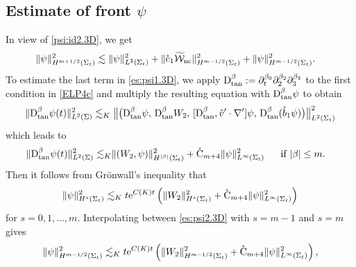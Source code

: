 \documentclass[twoside,11pt]{article}
\numberwithin{equation}{section}
\def\p{\partial}
\begin{document}
\subsection{Estimate of front $\psi$} \label{sec.psi}
In view of \eqref{psi:id2.3D}, we get %
\begin{align}
	& \|\psi\|_{H^{m+1/2}(\Sigma_{t})}^2 	\lesssim 	\|\psi\|_{L^{2}(\Sigma_{t})}^2 	+	\|\mathring{\rm c}_1\widetilde{\mathcal{W}}_{\rm nc}\|_{H^{m-1/2}(\Sigma_{t})}^2  +\|\psi \|_{H^{m-1/2}(\Sigma_{t})}^2.
	\label{es:psi1.3D}
\end{align}
To estimate the last term in  \eqref{es:psi1.3D}, we apply $\mathrm{D}_{\rm tan}^{\beta}:=\p_t^{\beta_0}\p_2^{\beta_2}\p_3^{\beta_3}$ %
to the first condition in \eqref{ELP4c} and multiply the resulting equation with $\mathrm{D}_{\rm tan}^{\beta}\psi$ to obtain
\begin{align}
	\|\mathrm{D}_{\rm tan}^{\beta}\psi(t)\|_{L^{2}(\Sigma)}^{2}
	\lesssim_K	\big\|\big(\mathrm{D}_{\rm tan}^{\beta}\psi , \, \mathrm{D}_{\rm tan}^{\beta}W_2,\,
	[\mathrm{D}_{\rm tan}^{\beta},\mathring{v}'\cdot\nabla']\psi, \, \mathrm{D}_{\rm tan}^{\beta}(\mathring{b}_1\psi) \big) \big\|_{L^{2}(\Sigma_t)}^{2}  \nonumber
\end{align}
which leads to
\begin{align}
	\|\mathrm{D}_{\rm tan}^{\beta}\psi(t)\|_{L^{2}(\Sigma)}^{2}
	\lesssim_K
		& {\|}(W_2,\psi){\|}_{H^{|\beta|}(\Sigma_{t})}^2
		+\mathring{\rm C}_{m+4}  \|\psi\|_{L^{\infty}(\Sigma_{t})}^2
		\ \  &&  		\textrm{if }|\beta|\leq m
		.
	\label{es:psi2a}
\end{align}
Then it follows from Gr\"{o}nwall's inequality that
\begin{align}
	{\|}\psi{\|}_{H^{s}(\Sigma_{t})}^2 	 \lesssim_K	 t\mathrm{e}^{C(K)t} \left({\|}W_2{\|}_{H^{s}(\Sigma_{t})}^2
	+\mathring{\rm C}_{m+4}  \|\psi\|_{L^{\infty}(\Sigma_{t})}^2\right)
	\label{es:psi2.3D}
\end{align}
for $s=0,1,\ldots,m$. Interpolating between \eqref{es:psi2.3D} with $s=m-1$ and $s=m$ gives
\begin{align}
	{\|}\psi{\|}_{H^{m-1/2}(\Sigma_{t})}^2 	 \lesssim_K 	t\mathrm{e}^{C(K)t}\left({\|}W_2{\|}_{H^{m-1/2}(\Sigma_{t})}^2
	+ \mathring{\rm C}_{m+4}  \|\psi\|_{L^{\infty}(\Sigma_{t})}^2\right) ,
\nonumber %
\end{align}
\end{document}
